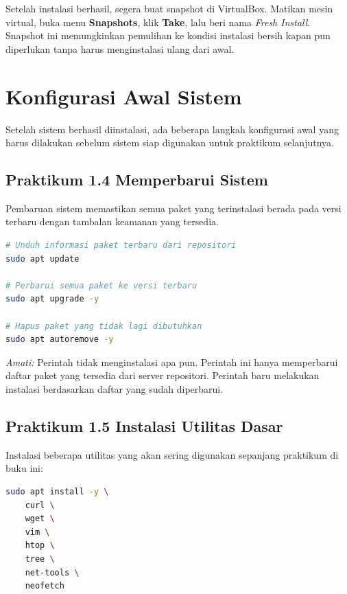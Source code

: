 \begin{tipbox}
Setelah instalasi berhasil, segera buat snapshot di VirtualBox. Matikan mesin virtual,
buka menu \textbf{Snapshots}, klik \textbf{Take}, lalu beri nama \textit{Fresh Install}.
Snapshot ini memungkinkan pemulihan ke kondisi instalasi bersih kapan pun diperlukan
tanpa harus menginstalasi ulang dari awal.
\end{tipbox}

\section{Konfigurasi Awal Sistem}
\label{sec:post-installation}

Setelah sistem berhasil diinstalasi, ada beberapa langkah konfigurasi awal yang harus
dilakukan sebelum sistem siap digunakan untuk praktikum selanjutnya.

\subsection*{Praktikum 1.4 Memperbarui Sistem}

Pembaruan sistem memastikan semua paket yang terinstalasi berada pada versi terbaru
dengan tambalan keamanan yang tersedia.

\begin{lstlisting}[language=bash, caption={Memperbarui paket sistem}]
# Unduh informasi paket terbaru dari repositori
sudo apt update

# Perbarui semua paket ke versi terbaru
sudo apt upgrade -y

# Hapus paket yang tidak lagi dibutuhkan
sudo apt autoremove -y
\end{lstlisting}

\textit{Amati:} Perintah  tidak menginstalasi apa pun. Perintah ini
hanya memperbarui daftar paket yang tersedia dari server repositori. Perintah
 baru melakukan instalasi berdasarkan daftar yang sudah diperbarui.

\subsection*{Praktikum 1.5 Instalasi Utilitas Dasar}

Instalasi beberapa utilitas yang akan sering digunakan sepanjang praktikum di buku ini:

\begin{lstlisting}[language=bash, caption={Instalasi utilitas dasar}]
sudo apt install -y \
    curl \
    wget \
    vim \
    htop \
    tree \
    net-tools \
    neofetch
\end{lstlisting}

